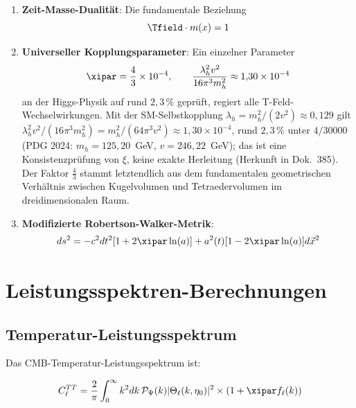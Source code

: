 	\begin{enumerate}
		\item \textbf{Zeit-Masse-Dualität}: Die fundamentale Beziehung
		\begin{equation}
			\Tfield \cdot m(x) = 1
			\label{eq:time_mass_duality}
		\end{equation}
		
		\item \textbf{Universeller Kopplungsparameter}: Ein einzelner Parameter
		\begin{equation}
			\xipar = \frac{4}{3} \times 10^{-4}, \qquad \frac{\lambda_h^2 v^2}{16\pi^3 m_h^2} \approx 1{,}30 \times 10^{-4}
			\label{eq:xi_definition}
		\end{equation}
		an der Higgs-Physik auf rund $2{,}3\,\%$ geprüft, regiert alle T-Feld-Wechselwirkungen. Mit der SM-Selbstkopplung $\lambda_h = m_h^2/(2v^2) \approx 0{,}129$ gilt $\lambda_h^2 v^2/(16\pi^3 m_h^2) = m_h^2/(64\pi^3 v^2) \approx 1{,}30 \times 10^{-4}$, rund $2{,}3\,\%$ unter $4/30000$ (PDG 2024: $m_h = 125{,}20$~GeV, $v = 246{,}22$~GeV); das ist eine Konsistenzprüfung von $\xi$, keine exakte Herleitung (Herkunft in Dok.~385). Der Faktor $\frac{4}{3}$ stammt letztendlich aus dem fundamentalen geometrischen Verhältnis zwischen Kugelvolumen und Tetraedervolumen im dreidimensionalen Raum.
		
		\item \textbf{Modifizierte Robertson-Walker-Metrik}:
		\begin{equation}
			ds^2 = -c^2dt^2[1 + 2\xipar\ln(a)] + a^2(t)[1 - 2\xipar\ln(a)]d\vec{x}^2
			\label{eq:modified_metric}
		\end{equation}
	\end{enumerate}
	
	\section{Leistungsspektren-Berechnungen}
	\label{sec:power_spectra}
	
	\subsection{Temperatur-Leistungsspektrum}
	
	Das CMB-Temperatur-Leistungsspektrum ist:
	
	\begin{equation}
		C_\ell^{TT} = \frac{2}{\pi}\int_0^\infty k^2 dk \, \mathcal{P}_\Psi(k) |\Theta_\ell(k,\eta_0)|^2 \times \left(1 + \xipar f_\ell(k)\right)
		\label{eq:cl_tt}
	\end{equation}
	
